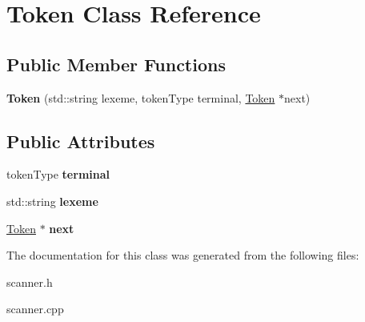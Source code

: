 \hypertarget{classToken}{\section{Token Class Reference}
\label{classToken}
}
\subsection*{Public Member Functions}
\begin{DoxyCompactItemize}
\item 
\hypertarget{classToken_a8830d3f87cac295b0d6d8d1405de7f66}{{\bfseries Token} (std\-::string lexeme, token\-Type terminal, \hyperlink{classToken}{Token} $\ast$next)}\label{classToken_a8830d3f87cac295b0d6d8d1405de7f66}

\end{DoxyCompactItemize}
\subsection*{Public Attributes}
\begin{DoxyCompactItemize}
\item 
\hypertarget{classToken_a11b4722b5e4023d234d2017126de378b}{token\-Type {\bfseries terminal}}\label{classToken_a11b4722b5e4023d234d2017126de378b}

\item 
\hypertarget{classToken_abbff29ede445ed4a8520580f12490832}{std\-::string {\bfseries lexeme}}\label{classToken_abbff29ede445ed4a8520580f12490832}

\item 
\hypertarget{classToken_a32f24a25af788c192e5b387dc8d67914}{\hyperlink{classToken}{Token} $\ast$ {\bfseries next}}\label{classToken_a32f24a25af788c192e5b387dc8d67914}

\end{DoxyCompactItemize}


The documentation for this class was generated from the following files\-:\begin{DoxyCompactItemize}
\item 
scanner.\-h\item 
scanner.\-cpp\end{DoxyCompactItemize}
